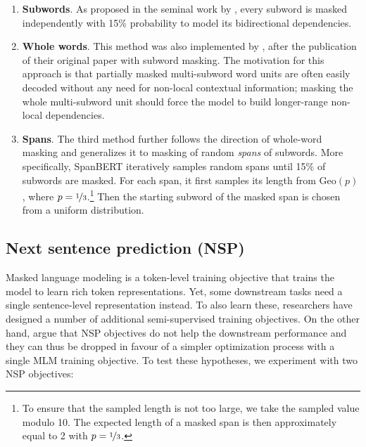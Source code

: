    \begin{enumerate}
        \item \textbf{Subwords}. As proposed in the seminal work by , every subword is masked independently with 15\% probability to model its bidirectional dependencies.

        \item \textbf{Whole words}. This method was also implemented by , after the publication of their original paper with subword masking. The motivation for this approach is that partially masked multi-subword word units are often easily decoded without any need for non-local contextual information; masking the whole multi-subword unit should force the model to build longer-range non-local dependencies. %
        
        \item \textbf{Spans}. The third method further follows the direction of whole-word masking and generalizes it to masking of random \textit{spans} of subwords. More specifically, SpanBERT \citep{joshi-etal-2020-spanbert} iteratively samples random spans until 15\% of subwords are masked. For each span, it first samples its length from $\textrm{Geo}(p)$, where $p=\nicefrac{1}{3}$.\footnote{To ensure that the sampled length is not too large, we take the sampled value modulo 10. The expected length of a masked span is then approximately equal to 2 with $p=\nicefrac{1}{3}$.} Then the starting subword of the masked span is chosen from a uniform distribution.
 \end{enumerate}
    
    \subsection{Next sentence prediction (NSP)}
    \label{sec:nsp}

    Masked language modeling is a token-level training objective that trains the model to learn rich token representations.
    Yet, some downstream tasks need a single sentence-level representation instead. To also learn these, researchers have designed a number of additional semi-supervised training objectives. On the other hand,  argue that NSP objectives do not help the downstream performance and they can thus be dropped in favour of a simpler optimization process with a single MLM training objective. To test these hypotheses, we experiment with two NSP objectives:
    
